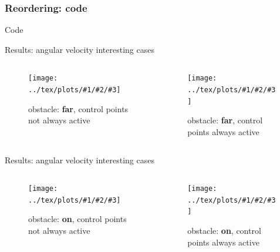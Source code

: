 \documentclass[11pt]{beamer}
\newcommand{\img}[4]{\texttt{[image: ../tex/plots/\#1/\#2/\#3]}}
\begin{document}
\begin{frame}[fragile]
\frametitle{Reordering: code}
\begin{block}{Code}
\begin{adjustbox}{width=.7\textwidth, height=.2\textwidth}

\end{adjustbox}
\end{block}
\end{frame}

\begin{frame}{Results: angular velocity interesting cases}
\begin{columns}
\begin{column}{.5\textwidth}
\begin{figure}[H]
\img{far}{notAlways}{joint_velocities.eps}{.4}
\caption{obstacle: \textbf{far}, control points not always active}
\end{figure}
\end{column}
\begin{column}{.5\textwidth}
\begin{figure}[H]
\img{far}{always}{joint_velocities.eps}{.4}
\caption{obstacle: \textbf{far}, control points always active}
\end{figure}
\end{column}
\end{columns}
\end{frame}

\begin{frame}{Results: angular velocity interesting cases}
\begin{columns}
\begin{column}{.5\textwidth}
\begin{figure}[H]
\img{on}{notAlways}{joint_velocities.eps}{.4}
\caption{obstacle: \textbf{on}, control points not always active}
\end{figure}
\end{column}
\begin{column}{.5\textwidth}
\begin{figure}[H]
\img{on}{always}{joint_velocities.eps}{.4}
\caption{obstacle: \textbf{on}, control points always active}
\end{figure}
\end{column}
\end{columns}
\end{frame}
\end{document}
